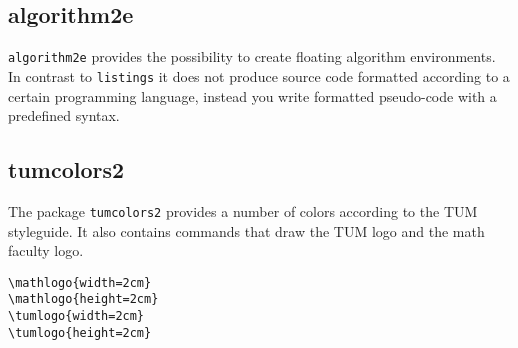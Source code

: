 \subsection{algorithm2e}
\label{sec:intro:algorithm2e}

\texttt{algorithm2e} provides the possibility to create floating algorithm environments. In contrast to \texttt{listings} it does not produce source code formatted according to a certain programming language, instead you write formatted pseudo-code with a predefined syntax.

\subsection{tumcolors2}
\label{sec:intro:tumcolors2}
The package \texttt{tumcolors2} provides a number of colors according to the TUM
styleguide. It also contains commands that draw the TUM logo and the math
faculty logo.

\begin{minipage}{0.4\linewidth}
\begin{verbatim}
\mathlogo{width=2cm}
\mathlogo{height=2cm}
\tumlogo{width=2cm}
\tumlogo{height=2cm}
\end{verbatim}
\end{minipage}
\begin{minipage}{0.3\linewidth}
\end{minipage}
\begin{minipage}{0.3\linewidth}
\end{minipage}

